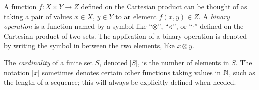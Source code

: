 \documentclass[../generics]{subfiles}
\begin{document}
A function $f\colon X\times Y\rightarrow Z$ defined on the Cartesian product can be thought of as taking a pair of values $x\in X$, $y\in Y$ to an element $f(x,y)\in Z$. A \emph{binary operation} is a function named by a symbol like ``\;$\otimes$\;'', ``\;$\triangleleft$\;'', or ``\;$\cdot$\;'' defined on the Cartesian product of two sets. The application of a binary operation is denoted by writing the symbol in between the two elements, like $x\otimes y$.

The \emph{cardinality} of a finite set $S$, denoted $|S|$, is the number of elements in $S$. The notation $|x|$ sometimes denotes certain other functions taking values in $\mathbb{N}$, such as the length of a sequence; this will always be explicitly defined when needed.
\end{document}
